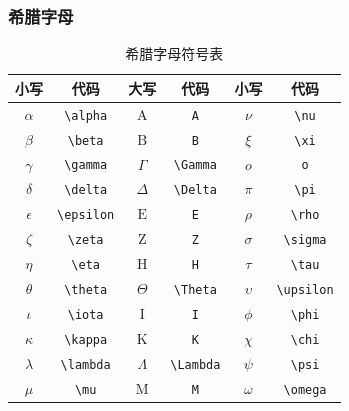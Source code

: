 \documentclass{article}
\begin{document}
\subsubsection{希腊字母}
\begin{table}[H]
      \centering
      \begin{tabular}{|c|c|c|c|c|c|}
            \hline
            小写         & 代码              & 大写           & 代码             & 小写         & 代码              \\
            \hline
            $\alpha$   & \verb|\alpha|   & $\mathrm{A}$ & \verb|A|       & $\nu$      & \verb|\nu|      \\
            $\beta$    & \verb|\beta|    & $\mathrm{B}$ & \verb|B|       & $\xi$      & \verb|\xi|      \\
            $\gamma$   & \verb|\gamma|   & $\Gamma$     & \verb|\Gamma|  & $o$        & \verb|o|        \\
            $\delta$   & \verb|\delta|   & $\Delta$     & \verb|\Delta|  & $\pi$      & \verb|\pi|      \\
            $\epsilon$ & \verb|\epsilon| & $\mathrm{E}$ & \verb|E|       & $\rho$     & \verb|\rho|     \\
            $\zeta$    & \verb|\zeta|    & $\mathrm{Z}$ & \verb|Z|       & $\sigma$   & \verb|\sigma|   \\
            $\eta$     & \verb|\eta|     & $\mathrm{H}$ & \verb|H|       & $\tau$     & \verb|\tau|     \\
            $\theta$   & \verb|\theta|   & $\Theta$     & \verb|\Theta|  & $\upsilon$ & \verb|\upsilon| \\
            $\iota$    & \verb|\iota|    & $\mathrm{I}$ & \verb|I|       & $\phi$     & \verb|\phi|     \\
            $\kappa$   & \verb|\kappa|   & $\mathrm{K}$ & \verb|K|       & $\chi$     & \verb|\chi|     \\
            $\lambda$  & \verb|\lambda|  & $\Lambda$    & \verb|\Lambda| & $\psi$     & \verb|\psi|     \\
            $\mu$      & \verb|\mu|      & $\mathrm{M}$ & \verb|M|       & $\omega$   & \verb|\omega|   \\
            \hline
      \end{tabular}
      \caption{希腊字母符号表}
\end{table}
\end{document}
